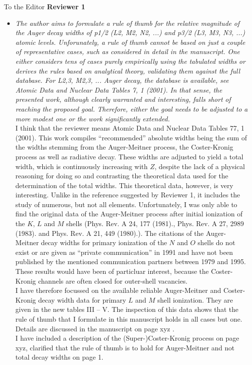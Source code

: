 \documentclass[DIN,pagenumber=false,parskip=half,fromalign=left,fromphone=false,fromemail=true,fromurl=false,fromlogo=false,fromrule=false]{scrlttr2}
\begin{document}
\begin{letter}{To the Editor}
\textbf{Reviewer 1}
\begin{itemize}
 \item \emph{The author aims to formulate a rule of thumb for the relative magnitude of
       the Auger decay widths of p1/2 (L2, M2, N2, ...) and p3/2 (L3, M3, N3, ...)
       atomic levels. Unforunately, a rule of thumb cannot be based on just a couple
       of representative cases, such as considered in detail in the manuscript. One
       either considers tens of cases purely empirically using the tabulated widths or
       derives the rules based on analytical theory, validating them against the full
       database. For L2,3, M2,3, ... Auger decay, the database is available, see
       Atomic Data and Nuclear Data Tables 7, 1 (2001). In that sense, the presented
       work, although clearly warranted and interesting, falls short of reaching the
       proposed goal. Therefore, either the goal needs to be adjusted to a more modest
       one or the work significantly extended.}\\
       I think that the reviewer means Atomic Data and Nuclear Data Tables 77, 1 (2001).
       This work compiles ``recommended'' absolute widths
       being the sum of the widths stemming from
       the Auger-Meitner process,
       the Coster-Kronig process as well as radiative decay. These widths are
       adjusted to yield a total width, which is continuously increasing with $Z$,
       despite the lack of a physical reasoning for doing so and contrasting the
       theoretical data used for the determination of the total widths. This theoretical
       data, however, is very interesting. Unlike in the reference suggested by
       Reviewer 1, it includes the study of numerous, but not all elements.
       Unfortunately, I was only able to find
       the original data of the Auger-Meitner process after initial ionization of the
       $K$, $L$ and $M$ shells (Phys. Rev. A 24, 177 (1981)., Phys. Rev. A 27, 2989 (1983).
       and Phys. Rev. A 21, 449 (1980).). The citations of the Auger-Meitner decay widths
       for primary ionization of the $N$ and $O$ shells do not exist or are given as
       ``private communication'' in 1991 and have not been published by the
       mentioned communication partners between 1979 and 1995. These results would have
       been of particluar interest, because the Coster-Kronig channels are often
       closed for outer-shell vacancies.\\
       I have therefore focussed on the available reliable Auger-Meitner and
       Coster-Kronig decay width data for primary
       $L$ and $M$ shell ionization. They are given in the new tables
       III -- V. The inspection of this data shows that the rule of thumb that I
       formulate in this manuscript holds in all cases but one.
       Details are discussed in the manuscript on page xyz .\\
       I have included a description of the (Super-)Coster-Kronig process on page xyz,
       clarified that the rule of thumb is to hold for Auger-Meitner and not
       total decay widths on page 1.
\end{itemize}


\end{letter}
\end{document}
